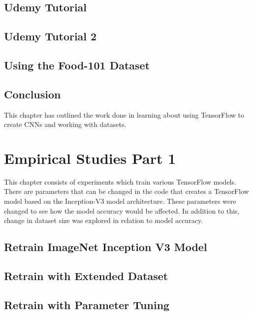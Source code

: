 \section{Udemy Tutorial}
\label{udemy1}


\section{Udemy Tutorial 2}
\label{udemy2}


\section{Using the Food-101 Dataset}
\label{food101}


\section{Conclusion}
This chapter has outlined the work done in learning about using TensorFlow to create CNNs and working with datasets.

\chapter{Empirical Studies Part 1}
This chapter consists of experiments which train various TensorFlow models.
There are parameters that can be changed in the code that creates a TensorFlow model based on the Inception-V3 model architecture.
These parameters were changed to see how the model accuracy would be affected.
In addition to this, change in dataset size was explored in relation to model accuracy.

\section{Retrain ImageNet Inception V3 Model}
\label{inception}


\section{Retrain with Extended Dataset}
\label{extended}


\section{Retrain with Parameter Tuning}
\label{parameterTuning}


